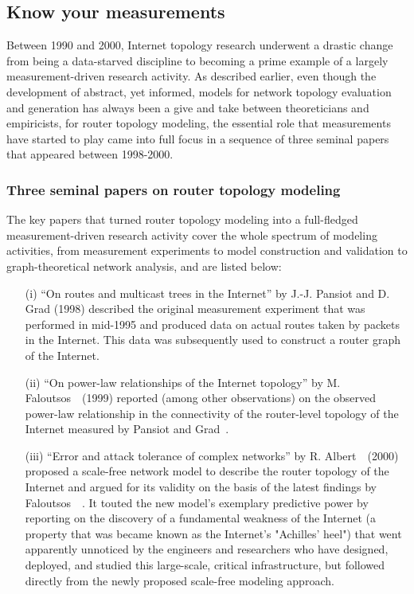 \subsection{Know your measurements}
\label{sec:router_measurements}

Between 1990 and 2000, Internet topology research underwent a drastic change from being
a data-starved discipline to becoming a prime example of a largely measurement-driven research 
activity.  As described earlier, even though the development of abstract, yet informed,
models for network topology evaluation and generation has always been a give and take between
theoreticians and empiricists, for router topology modeling, the essential role that
measurements have started to play came into full focus in a sequence of three seminal papers that
appeared between 1998-2000. 

\subsubsection{Three seminal papers on router topology modeling}
\label{sec:router_seminal}

The key papers that turned router topology modeling into a full-fledged measurement-driven
research activity cover the whole spectrum of modeling activities, from
measurement experiments to model construction and validation to graph-theoretical network
analysis, and are listed below: 

\begin{itemize}
\item[(i)] ``On routes and multicast trees in the Internet'' by
  J.-J. Pansiot and D. Grad (1998) \cite{pansiot98:_inter} described
  the original measurement experiment that was performed in mid-1995
  and produced data on actual routes taken by packets in the
  Internet. This data was subsequently used to construct a router
  graph of the Internet.

\item[(ii)] ``On power-law relationships of the Internet topology'' by
  M. Faloutsos~\etal~(1999)
  \cite{faloutsos99:_power_law_relat_of_inter_topol} reported (among
  other observations) on the observed power-law relationship in the
  connectivity of the router-level topology of the Internet measured
  by Pansiot and Grad~\cite{pansiot98:_inter}.

\item[(iii)] ``Error and attack tolerance of complex networks'' by
  R. Albert~\etal~(2000) \cite{barabasi00} proposed a scale-free
  network model to describe the router topology of the Internet and
  argued for its validity on the basis of the latest findings by
  Faloutsos~\etal~\cite{faloutsos99:_power_law_relat_of_inter_topol}.
  It touted the new model's exemplary predictive power by reporting on
  the discovery of a fundamental weakness of the Internet (a property
  that was became known as the Internet's "Achilles' heel") that went
  apparently unnoticed by the engineers and researchers who have
  designed, deployed, and studied this large-scale, critical
  infrastructure, but followed directly from the newly proposed
  scale-free modeling approach.
\end{itemize}

